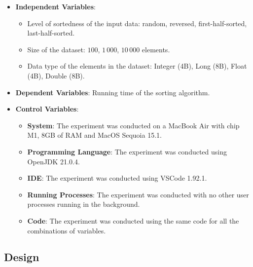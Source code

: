 \documentclass[unicode,11pt,a4paper,oneside,numbers=endperiod,openany]{scrartcl}
\begin{document}
    \begin{itemize}

        \item \textbf{Independent Variables}:
        
        \begin{itemize}
            \item Level of sortedness of the input data: random, reversed, first-half-sorted, last-half-sorted.
            \item Size of the dataset: $100$, $1\,000$, $10\,000$ elements.
            \item Data type of the elements in the dataset: Integer (4B), Long (8B), Float (4B), Double (8B).
        \end{itemize}

        \item \textbf{Dependent Variables}: Running time of the sorting algorithm.
        
        \item \textbf{Control Variables}: 

        \begin{itemize}
            \item \textbf{System}: The experiment was conducted on a MacBook Air with chip M1, 8GB of RAM and MacOS Sequoia 15.1.
            \item \textbf{Programming Language}: The experiment was conducted using OpenJDK 21.0.4.
            \item \textbf{IDE}: The experiment was conducted using VSCode 1.92.1.
            \item \textbf{Running Processes}: The experiment was conducted with no other user processes running in the background.
            \item \textbf{Code}: The experiment was conducted using the same code for all the combinations of variables.
        \end{itemize}

    \end{itemize}


    \subsection{Design}
\end{document}

